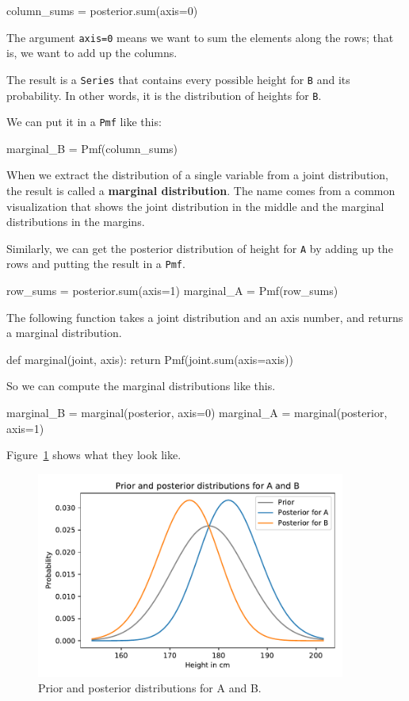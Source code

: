 \documentclass[12pt]{book}
\theoremstyle{exercise}
\newcommand{\py}[1]{{\tt #1}}%
\begin{document}
\begin{code}
column_sums = posterior.sum(axis=0)
\end{code}

The argument \py{axis=0} means we want to sum the elements along the rows; that is, we want to add up the columns.

The result is a \py{Series} that contains every possible height for \py{B} and its probability.  In other words, it is the distribution of heights for \py{B}.

We can put it in a \py{Pmf} like this:

\begin{code}
marginal_B = Pmf(column_sums)
\end{code}

When we extract the distribution of a single variable from a joint distribution, the result is called a {\bf marginal distribution}.
The name comes from a common visualization that shows the joint distribution in the middle and the marginal distributions in the margins.

Similarly, we can get the posterior distribution of height for \py{A} by adding up the rows and putting the result in a \py{Pmf}.

\begin{code}
row_sums = posterior.sum(axis=1)
marginal_A = Pmf(row_sums)
\end{code}

The following function takes a joint distribution and an axis number, and returns a marginal distribution.

\begin{code}
def marginal(joint, axis):
    return Pmf(joint.sum(axis=axis))
\end{code}

So we can compute the marginal distributions like this.

\begin{code}
marginal_B = marginal(posterior, axis=0)
marginal_A = marginal(posterior, axis=1)
\end{code}

Figure~\ref{fig09-04} shows what they look like.

\begin{figure}
\centerline{\includegraphics[width=4in]{figs/fig09-04.pdf}}
\caption{Prior and posterior distributions for A and B.}
\label{fig09-04}
\end{figure}
\end{document}
